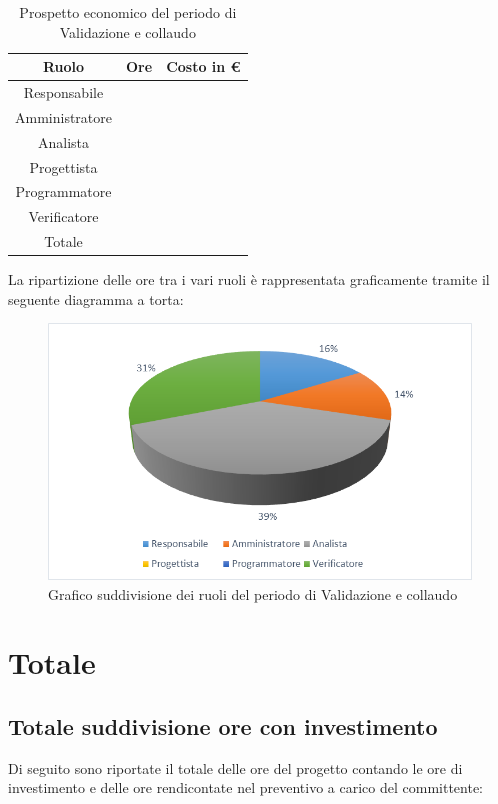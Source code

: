 \documentclass[./PianodiProgetto.tex]{subfiles}
\begin{document}
\begin{table}[H]
	\centering
	\begin{tabular}{|c|c|c|}
		\hline
		Ruolo&Ore&Costo in € \\ \hline
		Responsabile& &  \\ \hline
		Amministratore& &  \\ \hline
		Analista& &  \\ \hline
		Progettista& &  \\ \hline
		Programmatore& &  \\ \hline
		Verificatore& &  \\ \hline
		Totale& & \\ \hline
	\end{tabular}
	\caption{Prospetto economico del periodo di Validazione e collaudo}
\end{table}

La ripartizione delle ore tra i vari ruoli è rappresentata graficamente tramite il seguente diagramma a torta:

\begin{figure}[H]
	\centering
	\includegraphics[width=1\linewidth]{img/grafici/ValidazioneCollaudoProspettoEconomico}
	\caption{Grafico suddivisione dei ruoli del periodo di Validazione e collaudo}
	\label{fig:validazione-collaudo-prospetto-economico}
\end{figure}

\section{Totale}
\subsection{Totale suddivisione ore con investimento}
Di seguito sono riportate il totale delle ore del progetto contando le ore di investimento e delle ore rendicontate nel preventivo a carico del committente:
\end{document}
